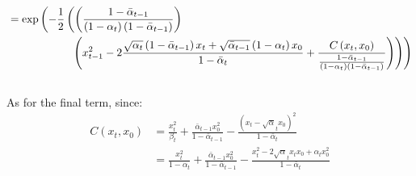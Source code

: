 \documentclass[twoside]{article}
\numberwithin{equation}{section}
\numberwithin{figure}{section}
\begin{document}
\begin{align}
  &= \exp \left(- \frac{1}{2} \left( \left(\frac{1 - \bar{\alpha}_{t-1}}{\left(1 - \alpha_t\right)\left(1 - \bar{\alpha}_{t-1}\right)}\right)  \right. \right. \\
  &\hspace{2cm} \left. \left. \left(x_{t-1}^2 - 2 \frac{\sqrt{\alpha_t} \left(1 - \bar{\alpha}_{t-1}\right) x_t + \sqrt{\bar{\alpha}_{t-1}}\left(1 - \alpha_t\right) x_0}{1 - \bar{\alpha}_t} + \frac{C\left(x_t, x_0\right)}{\frac{1 - \bar{\alpha}_{t-1}}{\left(1 - \alpha_t\right)\left(1 - \bar{\alpha}_{t-1}\right)}}\right) \right) \right) \notag 
\end{align}
\\
As for the final term, since:
\begin{align}
  C \left(x_t, x_0\right) &= \frac{x_t^2}{\beta_t} + \frac{\bar{\alpha}_{t-1} x_0^2}{1 - \bar{\alpha}_{t-1}} - \frac{\left(x_t - \sqrt{\alpha}_t x_0\right)^2}{1 - \bar{\alpha}_{t}} \\
  &= \frac{x_t^2}{1 - \alpha_t} + \frac{\bar{\alpha}_{t-1} x_0^2}{1 - \bar{\alpha}_{t-1}} - \frac{x_t^2 - 2 \sqrt{\alpha}_t x_t x_0 + \alpha_t x_0^2}{1 - \bar{\alpha}_{t}}
\end{align}
\end{document}

